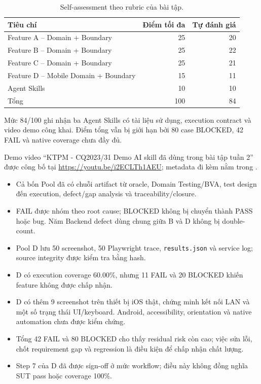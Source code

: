 \begin{table}[H]
  \centering
  \small
  \begin{tabular}{lrr}
    \toprule
    Tiêu chí & Điểm tối đa & Tự đánh giá \\
    \midrule
    Feature A -- Domain + Boundary & 25 & 20 \\
    Feature B -- Domain + Boundary & 25 & 22 \\
    Feature C -- Domain + Boundary & 25 & 21 \\
    Feature D -- Mobile Domain + Boundary & 15 & 11 \\
    Agent Skills & 10 & 10 \\
    \midrule
    Tổng & 100 & 84 \\
    \bottomrule
  \end{tabular}
  \caption{Self-assessment theo rubric của bài tập.}
  \label{tab:self-assessment}
\end{table}

Mức 84/100 ghi nhận ba Agent Skills có tài liệu sử dụng, execution contract và
video demo công khai. Điểm tổng vẫn bị giới hạn bởi 80 case BLOCKED, 42 FAIL và
native coverage chưa đầy đủ.

Demo video ``KTPM - CQ2023/31 Demo AI skill đã dùng trong bài tập tuần 2'' được
công bố tại \url{https://youtu.be/i2ECLTh1AEU}; metadata đi kèm nằm trong
.

\begin{itemize}
  \item Cả bốn Pool đã có chuỗi artifact từ oracle, Domain Testing/BVA, test
        design đến execution, defect/gap analysis và traceability/closure.
  \item FAIL được nhóm theo root cause; BLOCKED không bị chuyển thành PASS hoặc
        bug. Năm Backend defect dùng chung giữa B và D không bị double-count.
  \item Pool D lưu 50 screenshot, 50 Playwright trace, \texttt{results.json} và
        service log; source integrity được kiểm tra bằng hash.
  \item D có execution coverage 60.00\%, nhưng 11 FAIL và 20 BLOCKED khiến
        feature không được chấp nhận.
  \item D có thêm 9 screenshot trên thiết bị iOS thật, chứng minh kết nối LAN và
        một số trạng thái UI/keyboard. Android, accessibility, orientation và
        native automation chưa được kiểm chứng.
  \item Tổng 42 FAIL và 80 BLOCKED cho thấy residual risk còn cao; việc sửa lỗi,
        chốt requirement gap và regression là điều kiện để chấp nhận chất lượng.
  \item Step 7 của D đã được sign-off ở mức workflow; điều này không đồng nghĩa
        SUT pass hoặc coverage 100\%.
\end{itemize}
